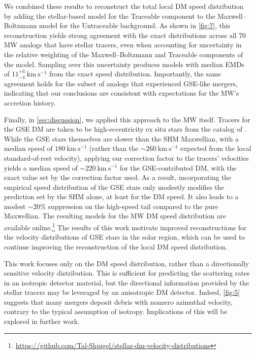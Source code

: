 \documentclass[twocolumn,tighten,twocolappendix]{aastex701}
\newcommand{\kms}{\ensuremath{\text{km}~\text{s}^{-1}}}
\newcommand{\osim}{\mathord{\sim}}
\begin{document}
We combined these results to reconstruct the total local DM speed distribution by adding the stellar-based model for the Traceable component to the Maxwell--Boltzmann model for the Untraceable background. As shown in \autoref{fig:7}, this reconstruction yields strong agreement with the exact distributions across all 70 MW analogs that have stellar tracers, even when accounting for uncertainty in the relative weighting of the Maxwell--Boltzmann and Traceable components of the model. Sampling over this uncertainty produces models with median EMDs of $11_{-4}^{+6}~\kms{}$ from the exact speed distribution. Importantly, the same agreement holds for the subset of analogs that experienced GSE-like mergers, indicating that our conclusions are consistent with expectations for the MW's accretion history.

Finally, in \autoref{sec:discussion}, we applied this approach to the MW itself. Tracers for the GSE DM are taken to be high-eccentricity ex situ stars from the catalog of \citet{2020A&A...636A..75O}. While the GSE stars themselves are slower than the SHM Maxwellian, with a median speed of $180~\kms{}$ (rather than the $\osim260~\kms{}$ expected from the local standard-of-rest velocity), applying our correction factor to the tracers' velocities yields a median speed of $\osim220~\kms{}$ for the GSE-contributed DM, with the exact value set by the correction factor used. As a result, incorporating the empirical speed distribution of the GSE stars only modestly modifies the prediction set by the SHM alone, at least for the DM speed. It also leads to a modest $\osim20\%$ suppression on the high-speed tail compared to the pure Maxwellian. The resulting models for the MW DM speed distribution are available online.\footnote{\url{https://github.com/Tal-Shpigel/stellar-dm-velocity-distributions}} The results of this work motivate improved reconstructions for the velocity distributions of GSE stars in the solar region, which can be used to continue improving the reconstruction of the local DM speed distribution.

This work focuses only on the DM speed distribution, rather than a directionally sensitive velocity distribution. This is sufficient for predicting the scattering rates in an isotropic detector material, but the directional information provided by the stellar tracers may be leveraged by an anisotropic DM detector. Indeed, \autoref{fig:5} suggests that many mergers deposit debris with nonzero azimuthal velocity, contrary to the typical assumption of isotropy. Implications of this will be explored in further work. 
\end{document}
